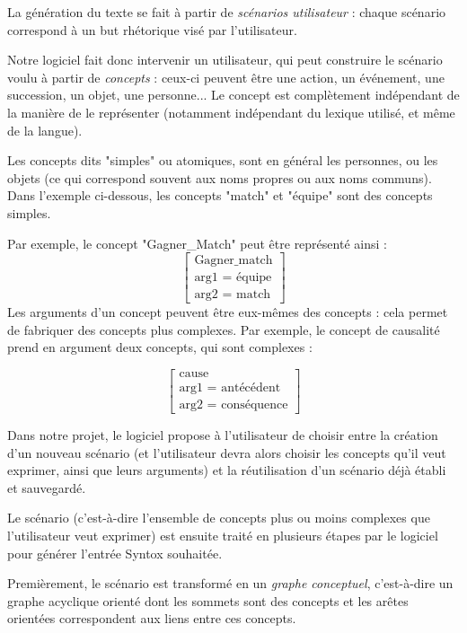 \documentclass[12pt]{report}
\begin{document}
\bigskip

La génération du texte se fait à partir de \emph{scénarios utilisateur} : chaque scénario correspond à un but rhétorique visé par l'utilisateur.

Notre logiciel fait donc intervenir un utilisateur, qui peut construire le scénario voulu à partir de \emph{concepts} : ceux-ci peuvent être une action, un événement, une succession, un objet, une personne... Le concept est complètement indépendant de la manière de le représenter (notamment indépendant du lexique utilisé, et même de la langue).

Les concepts dits "simples" ou atomiques, sont en général les personnes, ou les objets (ce qui correspond souvent aux noms propres ou aux noms communs). Dans l'exemple ci-dessous, les concepts "match" et "équipe" sont des concepts simples.

Par exemple, le concept "Gagner\_Match" peut être représenté ainsi :
$$\begin{bmatrix}
\text{Gagner\_match} \\ \text{arg1 = équipe} \\ \text{arg2 = match}
\end{bmatrix}
$$
Les arguments d'un concept peuvent être eux-mêmes des concepts : cela permet de fabriquer des concepts plus complexes.
Par exemple, le concept de causalité prend en argument deux concepts, qui sont complexes :

$$\begin{bmatrix}
\text{cause} \\ \text{arg1 = antécédent} \\ \text{arg2 = conséquence}
\end{bmatrix}
$$

Dans notre projet, le logiciel propose à l'utilisateur de choisir entre la création d'un nouveau scénario (et l'utilisateur devra alors choisir les concepts qu'il veut exprimer, ainsi que leurs arguments) et la réutilisation d'un scénario déjà établi et sauvegardé.

\bigskip


Le scénario (c'est-à-dire l'ensemble de concepts plus ou moins complexes que l'utilisateur veut exprimer) est ensuite traité en plusieurs étapes par le logiciel pour générer l'entrée Syntox souhaitée.

Premièrement, le scénario est transformé en un \emph{graphe conceptuel}, c'est-à-dire un graphe acyclique orienté dont les sommets sont des concepts et les arêtes orientées correspondent aux liens entre ces concepts.
\end{document}
